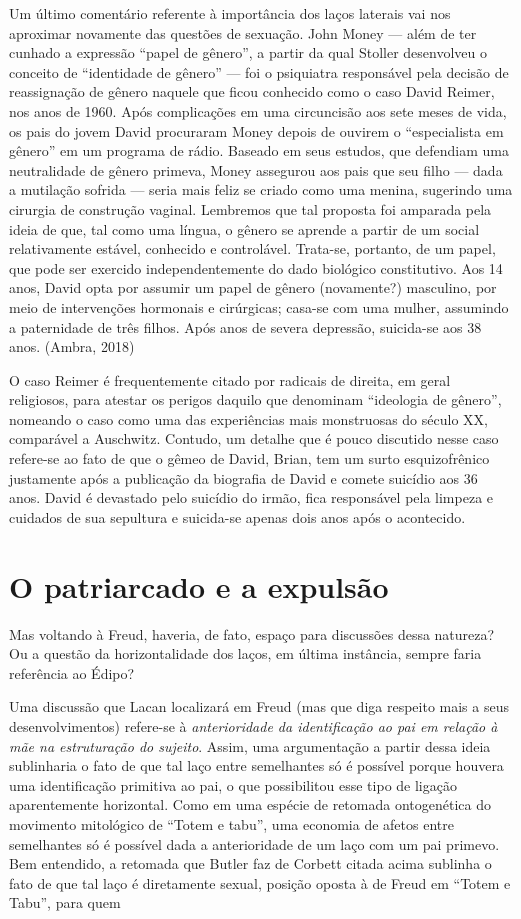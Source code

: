 Um último comentário referente à importância dos laços laterais vai nos
aproximar novamente das questões de sexuação. John Money --- além de ter
cunhado a expressão ``papel de gênero'', a partir da qual Stoller
desenvolveu o conceito de ``identidade de gênero'' --- foi o psiquiatra
responsável pela decisão de reassignação de gênero naquele que ficou
conhecido como o caso David Reimer, nos anos de 1960. Após complicações
em uma circuncisão aos sete meses de vida, os pais do jovem David
procuraram Money depois de ouvirem o ``especialista em gênero'' em um
programa de rádio. Baseado em seus estudos, que defendiam uma
neutralidade de gênero primeva, Money assegurou aos pais que seu filho
--- dada a mutilação sofrida --- seria mais feliz se criado como uma
menina, sugerindo uma cirurgia de construção vaginal. Lembremos que tal
proposta foi amparada pela ideia de que, tal como uma língua, o gênero
se aprende a partir de um social relativamente estável, conhecido e
controlável. Trata-se, portanto, de um papel, que pode ser exercido
independentemente do dado biológico constitutivo. Aos 14 anos, David
opta por assumir um papel de gênero (novamente?) masculino, por meio de
intervenções hormonais e cirúrgicas; casa-se com uma mulher, assumindo a
paternidade de três filhos. Após anos de severa depressão, suicida-se
aos 38 anos. (Ambra, 2018)

O caso Reimer é frequentemente citado por radicais de direita, em geral
religiosos, para atestar os perigos daquilo que denominam ``ideologia de
gênero'', nomeando o caso como uma das experiências mais monstruosas do
século XX, comparável a Auschwitz. Contudo, um detalhe que é pouco
discutido nesse caso refere-se ao fato de que o gêmeo de David, Brian,
tem um surto esquizofrênico justamente após a publicação da biografia de
David e comete suicídio aos 36 anos. David é devastado pelo suicídio do
irmão, fica responsável pela limpeza e cuidados de sua sepultura e
suicida-se apenas dois anos após o acontecido.

\section{O patriarcado e a expulsão}

Mas voltando à Freud, haveria, de fato, espaço para discussões dessa
natureza? Ou a questão da horizontalidade dos laços, em última
instância, sempre faria referência ao Édipo?

Uma discussão que Lacan localizará em Freud (mas que diga respeito mais
a seus desenvolvimentos) refere-se à \emph{anterioridade da
identificação ao pai em relação à mãe na estruturação do sujeito}.
Assim, uma argumentação a partir dessa ideia sublinharia o fato de que
tal laço entre semelhantes só é possível porque houvera uma
identificação primitiva ao pai, o que possibilitou esse tipo de ligação
aparentemente horizontal. Como em uma espécie de retomada ontogenética
do movimento mitológico de ``Totem e tabu'', uma economia de afetos
entre semelhantes só é possível dada a anterioridade de um laço com um
pai primevo. Bem entendido, a retomada que Butler faz de Corbett citada
acima sublinha o fato de que tal laço é diretamente sexual, posição
oposta à de Freud em ``Totem e Tabu'', para quem

